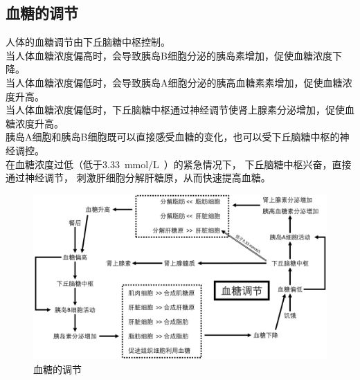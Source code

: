 \documentclass[UTF8]{ctexart}
\begin{document}
\subsection{血糖的调节}
    人体的血糖调节由下丘脑糖中枢控制。\\[3mm]
    当人体血糖浓度偏高时，会导致胰岛B细胞分泌的胰岛素增加，促使血糖浓度下降。\\[3mm]
    当人体血糖浓度偏低时，会导致胰岛A细胞分泌的胰高血糖素素增加，促使血糖浓度升高。\\[3mm]
    当人体血糖浓度偏低时，下丘脑糖中枢通过神经调节使肾上腺素分泌增加，促使血糖浓度升高。\\[3mm]
    胰岛A细胞和胰岛B细胞既可以直接感受血糖的变化，也可以受下丘脑糖中枢的神经调控。\\[3mm]
    在血糖浓度过低（低于$3.33$~mmol/L~）的紧急情况下，
    下丘脑糖中枢兴奋，直接通过神经调节，
    刺激肝细胞分解肝糖原，从而快速提高血糖。\vspace{15pt}
    \begin{figure}[h]
        \begin{center}
            \includegraphics[width=14cm]{BiologyImage/55.jpg}
        \end{center}
        \caption{血糖的调节}
    \end{figure}

\newpage
\end{document}
